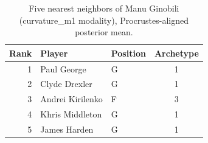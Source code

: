 \begin{table}[htbp]
  \centering\small
  \begin{tabular}{rllc}
    \toprule
    Rank & Player & Position & Archetype \\
    \midrule
    1 & Paul George & G & 1 \\
    2 & Clyde Drexler & G & 1 \\
    3 & Andrei Kirilenko & F & 3 \\
    4 & Khris Middleton & G & 1 \\
    5 & James Harden & G & 1 \\
    \bottomrule
  \end{tabular}
  \caption{Five nearest neighbors of Manu Ginobili (curvature_m1 modality), Procrustes-aligned posterior mean.}
  \label{tab:Manu_Ginobili_neighbors_curvature_m1}
\end{table}

